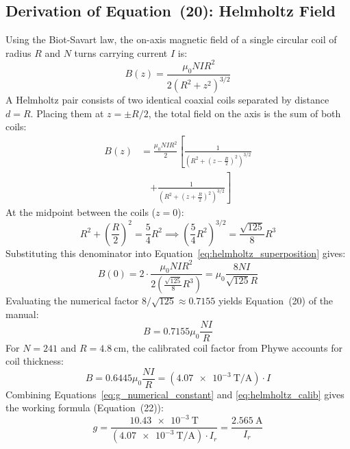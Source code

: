 \documentclass[journal]{IEEEtran}
\begin{document}
\subsection{Derivation of Equation~(20): Helmholtz Field}
Using the Biot-Savart law, the on-axis magnetic field of a single circular coil of radius $R$ and $N$ turns carrying current $I$ is:
\begin{equation}
    B(z) = \frac{\mu_0 N I R^2}{2 (R^2 + z^2)^{3/2}}
    \label{eq:single_coil_B}
\end{equation}
A Helmholtz pair consists of two identical coaxial coils separated by distance $d = R$. Placing them at $z = \pm R/2$, the total field on the axis is the sum of both coils:
\begin{align}
    B(z) &= \frac{\mu_0 N I R^2}{2} \left[ \frac{1}{\left(R^2 + \left(z - \frac{R}{2}\right)^2\right)^{3/2}} \right. \nonumber \\
         &\quad \left. + \frac{1}{\left(R^2 + \left(z + \frac{R}{2}\right)^2\right)^{3/2}} \right]
    \label{eq:helmholtz_superposition}
\end{align}
At the midpoint between the coils ($z = 0$):
\begin{equation}
    R^2 + \left(\frac{R}{2}\right)^2 = \frac{5}{4} R^2 \implies \left(\frac{5}{4} R^2\right)^{3/2} = \frac{\sqrt{125}}{8} R^3
\end{equation}
Substituting this denominator into Equation~\eqref{eq:helmholtz_superposition} gives:
\begin{equation}
    B(0) = 2 \cdot \frac{\mu_0 N I R^2}{2 \left(\frac{\sqrt{125}}{8} R^3\right)} = \mu_0 \frac{8 N I}{\sqrt{125} R}
    \label{eq:helmholtz_exact}
\end{equation}
Evaluating the numerical factor $8/\sqrt{125} \approx 0.7155$ yields Equation~(20) of the manual:
\begin{equation}
    B = 0.7155 \mu_0 \frac{N I}{R}
    \label{eq:helmholtz_ideal}
\end{equation}
For $N = 241$ and $R = \SI{4.8}{\centi\meter}$, the calibrated coil factor from Phywe accounts for coil thickness:
\begin{equation}
    B = 0.6445 \mu_0 \frac{N I}{R} = (\SI{4.07e-3}{\tesla\per\ampere}) \cdot I
    \label{eq:helmholtz_calib}
\end{equation}
Combining Equations~\eqref{eq:g_numerical_constant} and \eqref{eq:helmholtz_calib} gives the working formula (Equation~(22)):
\begin{equation}
    g = \frac{\SI{10.43e-3}{\tesla}}{(\SI{4.07e-3}{\tesla\per\ampere}) \cdot I_r} = \frac{\SI{2.565}{\ampere}}{I_r}
    \label{eq:g_working_formula}
\end{equation}
\end{document}
